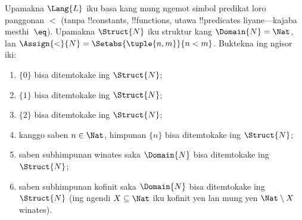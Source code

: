 \documentclass[../../../include/open-logic-section]{subfiles}
\begin{document}
\begin{prob}
Upamakna $\Lang{L}$ iku basa kang mung ngemot
simbol predikat loro panggonan $<$ (tanpa
!!{constant}s, !!{function}s, utawa !!{predicate}s
liyane---kajaba mesthi~$\eq$). Upamakna
$\Struct{N}$ iku struktur kang
$\Domain{N} = \Nat$, lan
$\Assign{<}{N} = \Setabs{\tuple{n,m}}{n <
  m}$. Buktekna ing ngisor iki:
\begin{enumerate}
\item $\{ 0 \}$ bisa ditemtokake ing $\Struct{N}$;
\item $\{ 1 \}$ bisa ditemtokake ing $\Struct{N}$;
\item $\{ 2 \}$ bisa ditemtokake ing $\Struct{N}$;
\item kanggo saben $n \in \Nat$, himpunan
  $\{ n \}$ bisa ditemtokake ing $\Struct{N}$;
\item saben subhimpunan winates saka $\Domain{N}$
  bisa ditemtokake ing $\Struct{N}$;
\item saben subhimpunan kofinit saka $\Domain{N}$
  bisa ditemtokake ing $\Struct{N}$
  (ing ngendi $X \subseteq \Nat$ iku kofinit
  yen lan mung yen $\Nat \setminus X$ winates).
\end{enumerate}
\end{prob}
\end{document}
